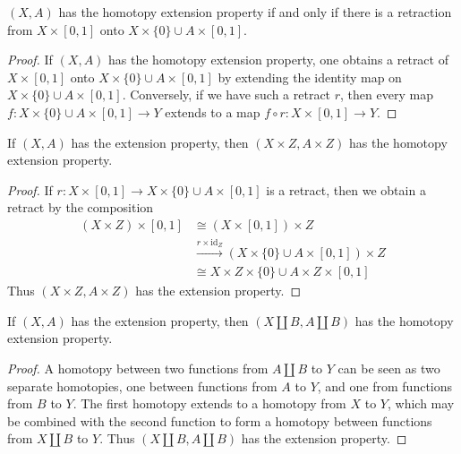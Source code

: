\begin{lemma}
    $(X,A)$ has the homotopy extension property if and only if there is a retraction from $X \times [0,1]$ onto $X \times \{ 0 \} \cup A \times [0,1]$.
\end{lemma}
\begin{proof}
    If $(X,A)$ has the homotopy extension property, one obtains a retract of $X \times [0,1]$ onto $X \times \{ 0 \} \cup A \times [0,1]$ by extending the identity map on $X \times \{ 0 \} \cup A \times [0,1]$. Conversely, if we have such a retract $r$, then every map $f: X \times \{ 0 \} \cup A \times [0,1] \to Y$ extends to a map $f \circ r: X \times [0,1] \to Y$.
\end{proof}

\begin{corollary}
    If $(X,A)$ has the extension property, then $(X \times Z, A \times Z)$ has the homotopy extension property.
\end{corollary}
\begin{proof}
    If $r: X \times [0,1] \to X \times \{ 0 \} \cup A \times [0,1]$ is a retract, then we obtain a retract by the composition
    \begin{align*}
        (X \times Z) \times [0,1] &\cong (X \times [0,1]) \times Z\\
        &\xrightarrow{r \times \text{id}_Z} (X \times \{ 0 \} \cup A \times [0,1]) \times Z\\
        &\cong X \times Z \times \{ 0 \} \cup A \times Z \times [0,1]
    \end{align*}
    Thus $(X \times Z, A \times Z)$ has the extension property.
\end{proof}

\begin{corollary}
    If $(X,A)$ has the extension property, then $(X \coprod B, A \coprod B)$ has the homotopy extension property.
\end{corollary}
\begin{proof}
    A homotopy between two functions from $A \coprod B$ to $Y$ can be seen as two separate homotopies, one between functions from $A$ to $Y$, and one from functions from $B$ to $Y$. The first homotopy extends to a homotopy from $X$ to $Y$, which may be combined with the second function to form a homotopy between functions from $X \coprod B$ to $Y$. Thus $(X \coprod B, A \coprod B)$ has the extension property.
\end{proof}

